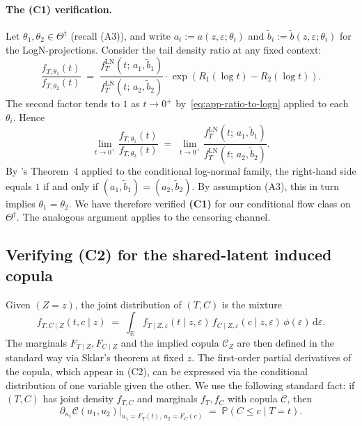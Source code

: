 \paragraph{The (C1) verification.}
Let $\theta_1, \theta_2 \in \Theta^\dagger$ (recall (A3)), and write
$a_i := a(z, \varepsilon; \theta_i)$ and
$\widetilde{b}_i := \widetilde{b}(z, \varepsilon; \theta_i)$ for the
LogN-projections. Consider the tail density ratio at any fixed context:
\[
    \frac{f_{T, \theta_1}(t)}{f_{T, \theta_2}(t)}
    \;=\; \frac{f_T^{\text{LN}}(t;\, a_1, \widetilde{b}_1)}{f_T^{\text{LN}}(t;\, a_2, \widetilde{b}_2)}
        \cdot \exp\!\left(R_1(\log t) - R_2(\log t)\right).
\]
The second factor tends to $1$ as $t \to 0^+$ by~\eqref{eq:app-ratio-to-logn}
applied to each $\theta_i$. Hence
\[
    \lim_{t \to 0^+} \frac{f_{T, \theta_1}(t)}{f_{T, \theta_2}(t)}
    \;=\; \lim_{t \to 0^+} \frac{f_T^{\text{LN}}(t;\, a_1, \widetilde{b}_1)}{f_T^{\text{LN}}(t;\, a_2, \widetilde{b}_2)}.
\]
By \citet{czado2023dependent}'s Theorem~4 applied to the conditional
log-normal family, the right-hand side equals $1$ if and only if
$(a_1, \widetilde{b}_1) = (a_2, \widetilde{b}_2)$. By assumption (A3),
this in turn implies $\theta_1 = \theta_2$. We have therefore verified
\textbf{(C1)} for our conditional flow class on $\Theta^\dagger$. The
analogous argument applies to the censoring channel.

\subsection{Verifying (C2) for the shared-latent induced copula}
\label{app:c2}

Given $(Z = z)$, the joint distribution of $(T, C)$ is the mixture
\[
    f_{T, C \mid Z}(t, c \mid z)
    \;=\; \int_{\mathbb{R}}
        f_{T \mid Z, \varepsilon}(t \mid z, \varepsilon)\,
        f_{C \mid Z, \varepsilon}(c \mid z, \varepsilon)\,
        \phi(\varepsilon)\,
    \mathrm{d}\varepsilon.
\]
The marginals $F_{T \mid Z}, F_{C \mid Z}$ and the implied copula
$\mathcal{C}_{Z}$ are then defined in the standard way via Sklar's
theorem at fixed $z$. The first-order partial derivatives of the copula,
which appear in (C2), can be expressed via the conditional distribution
of one variable given the other. We use the following standard fact: if
$(T, C)$ has joint density $f_{T, C}$ and marginals $f_T, f_C$ with
copula $\mathcal{C}$, then
\[
    \partial_{u_1} \mathcal{C}(u_1, u_2)\big|_{u_1 = F_T(t),\, u_2 = F_C(c)}
    \;=\; \mathbb{P}(C \le c \mid T = t).
\]

